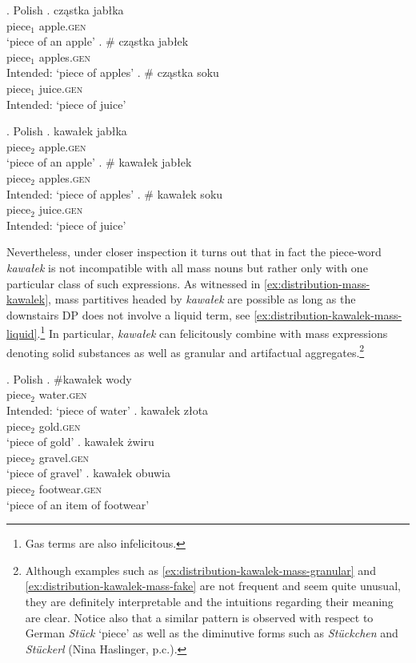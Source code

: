  \ex. Polish\label{ex:distribution-czastka}
  \ag. cząstka jabłka\label{ex:distribution-czastka-sg}\\
  piece$_1$ apple\textsc{.gen}\\
  `piece of an apple'
  \bg. \# cząstka jabłek\label{ex:distribution-czastka-pl}\\
  piece$_1$ apples\textsc{.gen}\\
  Intended: `piece of apples'
  \bg. \# cząstka soku\label{ex:distribution-czastka-mass}\\
  piece$_1$ juice\textsc{.gen}\\
  Intended: `piece of juice'

  \ex. Polish\label{ex:distribution-kawalek}
  \ag. kawałek jabłka\label{ex:distribution-kawalek-sg}\\
  piece$_2$ apple\textsc{.gen}\\
  `piece of an apple'
  \bg. \# kawałek jabłek\label{ex:distribution-kawalek-pl}\\
  piece$_2$ apples\textsc{.gen}\\
  Intended: `piece of apples'
  \bg. \# kawałek soku\label{ex:distribution-kawalek-mass}\\
  piece$_2$ juice\textsc{.gen}\\
  Intended: `piece of juice'

Nevertheless, under closer inspection it turns out that in fact the piece-word \textit{kawałek} is not incompatible with all mass nouns but rather only with one particular class of such expressions. As witnessed in \ref{ex:distribution-mass-kawalek}, mass partitives headed by \textit{kawałek} are possible as long as the downstairs DP does not involve a liquid term, see \ref{ex:distribution-kawalek-mass-liquid}.\footnote{Gas terms are also infelicitous.} In particular, \textit{kawałek} can felicitously combine with mass expressions denoting solid substances as well as granular and artifactual aggregates.\footnote{Although examples such as \ref{ex:distribution-kawalek-mass-granular} and \ref{ex:distribution-kawalek-mass-fake} are not frequent and seem quite unusual, they are definitely interpretable and the intuitions regarding their meaning are clear. Notice also that a similar pattern is observed with respect to German \textit{Stück} `piece' as well as the diminutive forms such as \textit{Stückchen} and \textit{Stückerl} (Nina Haslinger, p.c.).} 

\ex. Polish\label{ex:distribution-mass-kawalek}
  \ag. \#kawałek wody\label{ex:distribution-kawalek-mass-liquid}\\
  piece$_2$ water\textsc{.gen}\\
  Intended: `piece of water'
  \bg. kawałek złota\label{ex:distribution-kawalek-mass-solid}\\
  piece$_2$ gold\textsc{.gen}\\
  `piece of gold'
  \bg. kawałek żwiru\label{ex:distribution-kawalek-mass-granular}\\
  piece$_2$ gravel\textsc{.gen}\\
  `piece of gravel'
  \bg. kawałek obuwia\label{ex:distribution-kawalek-mass-fake}\\
  piece$_2$ footwear\textsc{.gen}\\
  `piece of an item of footwear'


